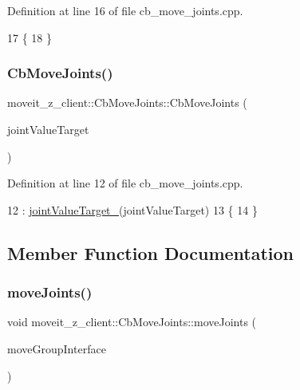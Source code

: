 Definition at line 16 of file cb\+\_\+move\+\_\+joints.\+cpp.


\begin{DoxyCode}
17   \{
18   \}
\end{DoxyCode}
\mbox{\label{classmoveit__z__client_1_1CbMoveJoints_ae0f43ac05e5263161541eb6bc15fa457}} 
\subsubsection{\texorpdfstring{Cb\+Move\+Joints()}{CbMoveJoints()}\hspace{0.1cm}{\footnotesize\ttfamily [2/2]}}
{\footnotesize\ttfamily moveit\+\_\+z\+\_\+client\+::\+Cb\+Move\+Joints\+::\+Cb\+Move\+Joints (\begin{DoxyParamCaption}\item[{const std\+::map$<$ std\+::string, double $>$ \&}]{joint\+Value\+Target }\end{DoxyParamCaption})}



Definition at line 12 of file cb\+\_\+move\+\_\+joints.\+cpp.


\begin{DoxyCode}
12                                                                               : 
      \hyperlink{classmoveit__z__client_1_1CbMoveJoints_a0f52577dd2fccf25f36c4c93e733c0f4}{jointValueTarget\_}(jointValueTarget)
13   \{
14   \}
\end{DoxyCode}


\subsection{Member Function Documentation}
\mbox{\label{classmoveit__z__client_1_1CbMoveJoints_a4dcc7bcf0ed857d9d580d4700cdeb5db}} 
\subsubsection{\texorpdfstring{move\+Joints()}{moveJoints()}}
{\footnotesize\ttfamily void moveit\+\_\+z\+\_\+client\+::\+Cb\+Move\+Joints\+::move\+Joints (\begin{DoxyParamCaption}\item[{moveit\+::planning\+\_\+interface\+::\+Move\+Group\+Interface \&}]{move\+Group\+Interface }\end{DoxyParamCaption})\hspace{0.3cm}{\ttfamily [protected]}}



